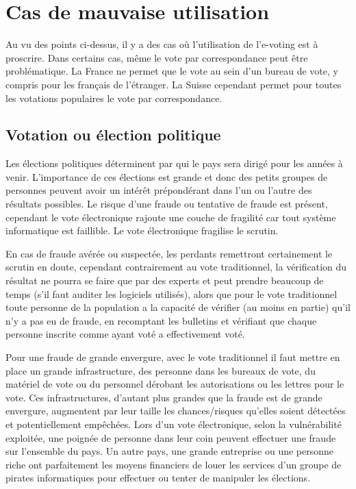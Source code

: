 \documentclass[../report]{subfiles}
\begin{document}
\section{Cas de mauvaise utilisation}

Au vu des points ci-dessus, il y a des cas où l'utilisation de l'e-voting est à proscrire. 
Dans certains cas, même le vote par correspondance peut être problématique. La France ne permet que 
le vote au sein d'un bureau de vote, y compris pour les français de l'étranger. La Suisse cependant 
permet pour toutes les votations populaires le vote par correspondance.

\subsection{Votation ou élection politique}

Les élections politiques déterminent par qui le pays sera dirigé pour les années à venir. 
L'importance de ces élections est grande et donc des petits groupes de personnes peuvent 
avoir un intérêt prépondérant dans l'un ou l'autre des résultats possibles. 
Le risque d'une fraude ou tentative de fraude est présent, cependant le vote électronique 
rajoute une couche de fragilité car tout système informatique est faillible.
Le vote électronique fragilise le scrutin.

En cas de fraude avérée ou suspectée, les perdants remettront certainement le scrutin en doute, 
cependant contrairement au vote traditionnel, la vérification du résultat ne pourra se faire que 
par des experts et peut prendre beaucoup de temps (s'il faut auditer les logiciels utilisés), alors que 
pour le vote traditionnel toute personne de la population a la capacité de vérifier (au moins en partie)
qu'il n'y a pas eu de fraude, en recomptant les bulletins et vérifiant que chaque personne inscrite comme ayant
voté a effectivement voté.

Pour une fraude de grande envergure, avec le vote traditionnel il faut mettre en place un grande infrastructure, des
personne dans les bureaux de vote, du matériel de vote ou du personnel dérobant les autorisations ou les lettres pour le vote.
Ces infrastructures, d'autant plus grandes que la fraude est de grande envergure, augmentent par leur taille les chances/risques qu'elles 
soient détectées et potentiellement empêchées. Lors d'un vote électronique, selon la vulnérabilité exploitée, une poignée
de personne dans leur coin peuvent effectuer une fraude sur l'ensemble du pays.
Un autre pays, une grande entreprise ou une personne riche ont parfaitement les moyens financiers de louer les services
d'un groupe de pirates informatiques pour effectuer ou tenter de manipuler les élections.
\end{document}
